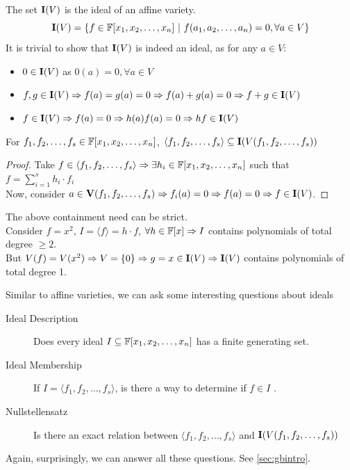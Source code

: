 \documentclass[a4paper,11pt]{article}
\begin{document}
\begin{defn}
    The set $\textbf{I}(V)$ is the ideal of an affine variety.
    \begin{equation}
        \textbf{I}(V) =\{f\in\mathbb{F}[x_1, x_2, \ldots, x_n] \ |\ f(a_1, a_2, \ldots, a_n)=0, \forall a\in V\}
    \end{equation}
    It is trivial to show that $\textbf{I}(V)$ is indeed an ideal, as for any $a\in V$:
    \begin{itemize}
        \item $0 \in \textbf{I}(V)$ as $0(a) = 0, \forall a \in V$
        \item $f,g \in \textbf{I}(V) \Rightarrow f(a) = g(a) = 0 \Rightarrow f(a)+g(a)=0 \Rightarrow f+g \in \textbf{I}(V)$
        \item $f \in \textbf{I}(V) \Rightarrow f(a) = 0 \Rightarrow h(a)f(a)=0 \Rightarrow hf \in \textbf{I}(V)$
    \end{itemize}
\end{defn}
\begin{lem}
    For $f_1,f_2,\ldots,f_s\in \mathbb{F}[x_1, x_2, \ldots, x_n]$, $\langle f_1,f_2,\ldots,f_s\rangle\subseteq\textbf{I}(V(f_1,f_2,\ldots,f_s))$
\end{lem}
\vspace{-1em}
\begin{proof}
    Take $f\in\langle f_1,f_2,\ldots,f_s\rangle\Rightarrow \exists h_i\in\mathbb{F}[x_1, x_2, \ldots, x_n]$ such that $f =\sum_{i=1}^{s}h_{i}\cdot f_{i}$\\
    Now, consider $a\in \textbf{V}(f_1,f_2,\ldots,f_{s})\Rightarrow f_i(a)=0 \Rightarrow f(a)=0 \Rightarrow f \in \textbf{I}(V)$.
\end{proof}
\begin{note}
    The above containment need can be strict.\\
    Consider $f = x^2$,
    $I=\langle f\rangle=h\cdot f$,  $\forall h \in \mathbb{F}[x] \Rightarrow I$ contains polynomials of total degree $\geq 2$.\\
    But $V(f) = V(x^2)\Rightarrow V = \{0\} \Rightarrow g=x \in \textbf{I}(V) \Rightarrow \textbf{I}(V)$ contains polynomials of total degree 1.
\end{note}
Similar to affine varieties, we can ask some interesting questions about ideals
\begin{description}
    \item[Ideal Description] Does every ideal $I\subseteq\mathbb{F}[x_1, x_2, \ldots, x_n]$ has a finite generating set.
    \item[Ideal Membership] If $I=\langle f_1,f_2,\ldots,f_s\rangle$, is there a way to determine if $f\in I$ .
    \item[Nullstellensatz] Is there an exact relation between $\langle f_1,f_2,\ldots,f_s\rangle$ and $\textbf{I}(V(f_1,f_2,\ldots,f_s))$
\end{description}
Again, surprisingly, we can answer all these questions. See \ref{sec:gbintro}.
\end{document}
